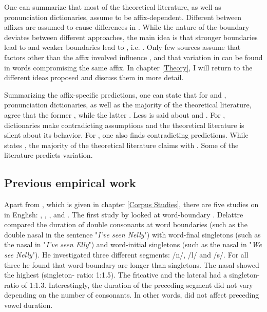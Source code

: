  
One can summarize that most of the theoretical literature, as well as pronunciation dictionaries, assume  to be affix-dependent. Different  between affixes are assumed to cause differences in . While the nature of the boundary deviates between different approaches, the main idea is that stronger boundaries lead to  and weaker boundaries lead to , i.e. . Only few sources assume that factors other than the affix involved influence , and that variation in  can be found in words compromising the same affix.  In chapter \ref{Theory}, I will return to the different ideas proposed and discuss them in more detail. 

Summarizing the affix-specific predictions, one can state that for  and , pronunciation dictionaries, as well as the majority of the theoretical literature, agree that the former , while the latter . Less is said about  and . For , dictionaries make contradicting assumptions and the theoretical literature is silent about its  behavior. For , one also finds contradicting predictions. While \cite{Wells.2008} states , the majority of the theoretical literature claims  with . Some of the literature predicts variation. 

\subsection{Previous empirical work}\label{previous empirical work}

Apart from \cite{BenHedia.2017}, which is given in chapter \ref{Corpus Studies}, there are five studies on  in English: \cite{Delattre.}, \cite{ Kaye.2005}, \cite{Oh.2012}, \cite{Oh.2013}   and \cite{Kotzor.2016}.   %
The first study by \cite{Delattre.} looked at word-boundary . Delattre compared the duration of double consonants at word boundaries (such as the double nasal  in the sentence "\textit{I've seen Nelly}") with word-final singletons (such as the nasal in "\textit{I've seen Elly}") and word-initial singletons (such as the nasal in "\textit{We see Nelly}"). He investigated three different segments: /n/, /l/ and /s/. For all three he found that word-boundary  are longer than singletons. The nasal showed the highest  (singleton- ratio: 1:1.5). The fricative and the lateral had a singleton- ratio of 1:1.3. Interestingly, the duration of the preceding segment did not vary depending on the number of consonants. In other words,  did not affect preceding vowel duration.

